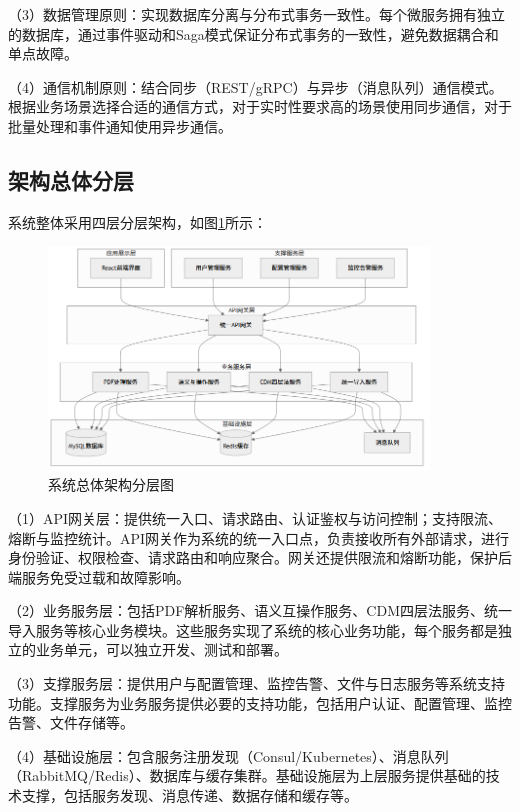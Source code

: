 （3）数据管理原则：实现数据库分离与分布式事务一致性。每个微服务拥有独立的数据库，通过事件驱动和Saga模式保证分布式事务的一致性，避免数据耦合和单点故障。

（4）通信机制原则：结合同步（REST/gRPC）与异步（消息队列）通信模式。根据业务场景选择合适的通信方式，对于实时性要求高的场景使用同步通信，对于批量处理和事件通知使用异步通信。

\subsection{架构总体分层}

系统整体采用四层分层架构，如图\ref{fig:system_architecture}所示：

\begin{figure}[H]
    \centering
    \includegraphics[width=0.9\textwidth]{chapters/fig-0/system_architecture_simple.png}
    \caption{系统总体架构分层图}
    \label{fig:system_architecture}
\end{figure}

（1）API网关层：提供统一入口、请求路由、认证鉴权与访问控制；支持限流、熔断与监控统计。API网关作为系统的统一入口点，负责接收所有外部请求，进行身份验证、权限检查、请求路由和响应聚合。网关还提供限流和熔断功能，保护后端服务免受过载和故障影响。

（2）业务服务层：包括PDF解析服务、语义互操作服务、CDM四层法服务、统一导入服务等核心业务模块。这些服务实现了系统的核心业务功能，每个服务都是独立的业务单元，可以独立开发、测试和部署。

（3）支撑服务层：提供用户与配置管理、监控告警、文件与日志服务等系统支持功能。支撑服务为业务服务提供必要的支持功能，包括用户认证、配置管理、监控告警、文件存储等。

（4）基础设施层：包含服务注册发现（Consul/Kubernetes）、消息队列（RabbitMQ/Redis）、数据库与缓存集群。基础设施层为上层服务提供基础的技术支撑，包括服务发现、消息传递、数据存储和缓存等。


